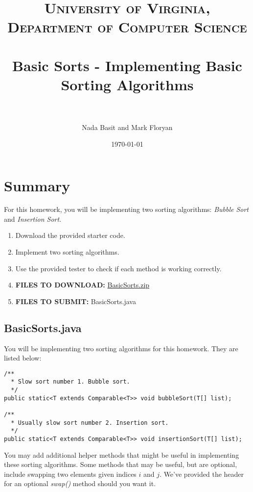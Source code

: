 \documentclass[paper=a4, fontsize=11pt, parskip=full]{scrartcl} %
\title{
\normalfont \normalsize
\textsc{University of Virginia, Department of Computer Science} \\ [25pt] %
\horrule{0.5pt} \\[0.4cm] %
\huge Basic Sorts - Implementing Basic Sorting Algorithms \\ %
\horrule{2pt} \\[0.5cm] %
}
\author{Nada Basit and Mark Floryan}
\date{\normalsize\today} %
\numberwithin{equation}{section} %
\numberwithin{figure}{section} %
\numberwithin{table}{section} %
\begin{document}
\maketitle %


\section{Summary}

For this homework, you will be implementing two sorting algorithms: \emph{Bubble Sort} and \emph{Insertion Sort}.

\begin{enumerate}
	\item Download the provided starter code.
	\item Implement two sorting algorithms.
	\item Use the provided tester to check if each method is working correctly.
	\item \textbf{FILES TO DOWNLOAD:} \href{https://uva-cs.github.io/dsa1/homeworks/BasicSorts/code/BasicSorts.zip}{BasicSorts.zip}
	\item \textbf{FILES TO SUBMIT:} BasicSorts.java
\end{enumerate}


\subsection{BasicSorts.java}

You will be implementing two sorting algorithms for this homework. They are listed below:

\begin{lstlisting}
/**
  * Slow sort number 1. Bubble sort.
  */
public static<T extends Comparable<T>> void bubbleSort(T[] list);
	
/**
  * Usually slow sort number 2. Insertion sort.
  */
public static<T extends Comparable<T>> void insertionSort(T[] list);
\end{lstlisting}

You may add additional helper methods that might be useful in implementing these sorting algorithms. Some methods that may be useful, but are optional, include swapping two elements given indices $i$ and $j$. We've provided the header for an optional \emph{swap()} method should you want it.
\end{document}
